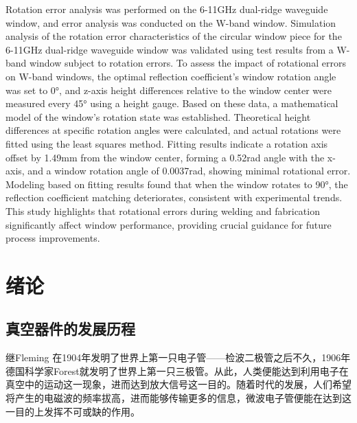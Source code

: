 \documentclass[master]{thesis-uestc}
\begin{document}
\begin{englishabstract}
 Rotation error analysis was performed on the 6-11GHz dual-ridge waveguide window, and error analysis was conducted on the W-band window. Simulation analysis of the rotation error characteristics of the circular window piece for the 6-11GHz dual-ridge waveguide window was validated using test results from a W-band window subject to rotation errors. To assess the impact of rotational errors on W-band windows, the optimal reflection coefficient's window rotation angle was set to 0°, and z-axis height differences relative to the window center were measured every 45° using a height gauge. Based on these data, a mathematical model of the window's rotation state was established. Theoretical height differences at specific rotation angles were calculated, and actual rotations were fitted using the least squares method. Fitting results indicate a rotation axis offset by 1.49mm from the window center, forming a 0.52rad angle with the x-axis, and a window rotation angle of 0.0037rad, showing minimal rotational error. Modeling based on fitting results found that when the window rotates to 90°, the reflection coefficient matching deteriorates, consistent with experimental trends. This study highlights that rotational errors during welding and fabrication significantly affect window performance, providing crucial guidance for future process improvements.

\end{englishabstract}

\thesistableofcontents %



\chapter{绪\hspace{6pt}论}
\section{真空器件的发展历程}
继Fleming 在1904年发明了世界上第一只电子管——检波二极管之后不久，1906年德国科学家Forest就发明了世界上第一只三极管。从此，人类便能达到利用电子在真空中的运动这一现象，进而达到放大信号这一目的。随着时代的发展，人们希望将产生的电磁波的频率拔高，进而能够传输更多的信息，微波电子管便能在达到这一目的上发挥不可或缺的作用。
\end{document}
